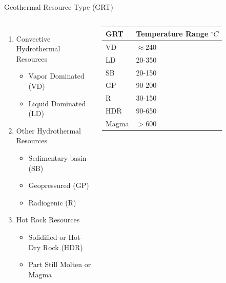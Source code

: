 \begin{frame}{Geothermal Resource Type (GRT)\cite{white1975assessment}}
\begin{columns}
    \begin{enumerate}
        \item Convective Hydrothermal Resources 
            \begin{itemize}
                \item Vapor Dominated (VD)
                \item Liquid Dominated (LD)
            \end{itemize}
        \item Other Hydrothermal Resources 
            \begin{itemize}
                \item Sedimentary basin (SB)
                \item Geopressured (GP)
                \item Radiogenic (R)
            \end{itemize}
        \item Hot Rock Resources 
            \begin{itemize}
                \item Solidified or Hot-Dry Rock (HDR)
                \item Part Still Molten or Magma
            \end{itemize}
    \end{enumerate}
       \begin{table}
		\centering
		 \begin{tabular}{p{1cm}p{1.5cm}}
			 \hline
			 GRT & Temperature Range $^{\circ}C$ \\
			 \hline
			 VD & $\approx240$ \\
			 LD & 20-350 \\
			 SB & 20-150 \\
		     GP & 90-200 \\
			 R & 30-150 \\
			 HDR & 90-650 \\
			 Magma & $>600$\\
			\hline
		  \end{tabular}
	\end{table}
\end{columns}
\end{frame}


